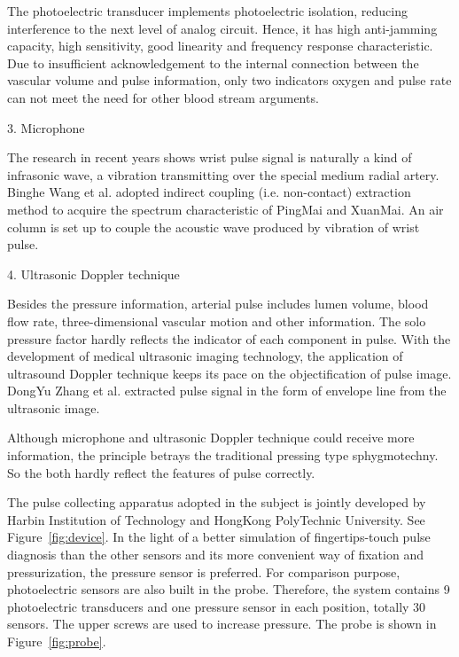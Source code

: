 The photoelectric transducer implements photoelectric
isolation, reducing interference to the next level of analog
circuit. Hence, it has high anti-jamming capacity, high sensitivity, 
good linearity and frequency response characteristic. Due to
insufficient acknowledgement to the internal connection between the vascular volume
and pulse information, only two indicators oxygen and pulse rate
can not meet the need for other blood stream arguments. 
\par 3. Microphone
\par The research in recent years shows wrist pulse signal is
naturally a kind of infrasonic wave, a vibration transmitting over the
special medium radial artery. Binghe Wang et al. adopted indirect
coupling (i.e. non-contact) extraction method to acquire the spectrum
characteristic of PingMai and XuanMai. An air column is set up to couple the
acoustic wave produced by vibration of wrist pulse.~\cite{B.1998}
\par 4. Ultrasonic Doppler technique
\par Besides the pressure information, arterial pulse includes lumen volume, blood flow
rate, three-dimensional vascular motion and other information. The
solo pressure factor hardly reflects the indicator of each component
in pulse. With the development of medical ultrasonic imaging technology, 
the application of ultrasound Doppler technique keeps its pace on the
objectification of pulse image. DongYu Zhang et al. extracted pulse
signal in the form of envelope line from the ultrasonic
image.~\cite{zhang2008wavelet} 

Although microphone and ultrasonic Doppler technique could receive
more information, the principle betrays the traditional pressing type
sphygmotechny. So the both hardly reflect the features of pulse
correctly.

The pulse collecting apparatus adopted in the subject is jointly
developed by Harbin Institution of Technology and HongKong PolyTechnic
University. See Figure~\ref{fig:device}. In the light of a better simulation of fingertips-touch
pulse diagnosis than the other sensors and its more convenient way of
fixation and pressurization, the pressure sensor is preferred. For
comparison purpose, photoelectric sensors are also built in the probe.
Therefore, the system contains 9 photoelectric transducers and one
pressure sensor in each position, totally 30 sensors. The upper screws
are used to increase pressure. The probe is shown in
Figure~\ref{fig:probe}. 

